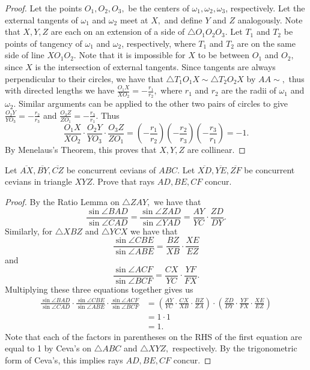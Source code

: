 \documentclass[letterpaper,oneside]{scrartcl}
\providecommand{\ol}{\overline}
\begin{document}
\begin{proof}
  Let the points $O_1,O_2,O_3,$ be the centers of $\omega_1, \omega_2, \omega_3$, respectively.
  Let the external tangents of $\omega_1$ and $\omega_2$ meet at $X,$ and define $Y$ and $Z$ analogously. Note that $X,Y,Z$ are each on an extension of a side of $\triangle O_1O_2O_3.$ Let $T_1$ and $T_2$ be points of tangency of $\omega_1$ and $\omega_2$, respectively, where $T_1$ and $T_2$ are on the same side of line $XO_1O_2.$ Note that it is impossible for $X$ to be between $O_1$ and $O_2,$ since $X$ is the intersection of external tangents. Since tangents are always perpendicular to their circles, we have that $\triangle T_1O_1X \sim \triangle T_2O_2X$ by $AA\sim,$ thus with directed lengths we have $\frac{O_1X}{XO_2} = -\frac{r_1}{r_2},$ where $r_1$ and $r_2$ are the radii of $\omega_1$ and $\omega_2.$ Similar arguments can be applied to the other two pairs of circles to give $\frac{O_2Y}{YO_3} = -\frac{r_2}{r_3}$ and $\frac{O_3Z}{ZO_1} = -\frac{r_3}{r_1}.$ Thus
  $$\frac{O_1X}{XO_2}\cdot\frac{O_2Y}{YO_3}\cdot\frac{O_3Z}{ZO_1} = \left(-\frac{r_1}{r_2}\right)\left(-\frac{r_2}{r_3}\right)\left(-\frac{r_3}{r_1}\right) = -1.$$ By Menelaus's Theorem, this proves that $X,Y,Z$ are collinear.
\end{proof}

\begin{theorem*}
  Let $\ol{AX},\ol{BY},\ol{CZ}$ be concurrent cevians of $ABC$. Let $\ol{XD}, \ol{YE},\ol{ZF}$ be concurrent cevians in triangle $XYZ$. Prove that rays $AD,BE,CF$ concur.
\end{theorem*}

\begin{proof}
  By the Ratio Lemma on $\triangle ZAY,$ we have that
  $$\frac{\sin\angle BAD}{\sin \angle CAD} = \frac{\sin\angle ZAD}{\sin \angle YAD} = \frac{AY}{YC}\cdot\frac{ZD}{DY}.$$
  Similarly, for $\triangle XBZ$ and $\triangle YCX$ we have that
  $$\frac{\sin\angle CBE}{\sin \angle ABE} = \frac{BZ}{XB}\cdot\frac{XE}{EZ}$$ and $$\frac{\sin\angle ACF}{\sin \angle BCF} = \frac{CX}{YC}\cdot\frac{YF}{FX}.$$
  Multiplying these three equations together gives us
  \begin{align*}
    \frac{\sin\angle BAD}{\sin \angle CAD}\cdot\frac{\sin\angle CBE}{\sin \angle ABE}\cdot\frac{\sin\angle ACF}{\sin \angle BCF} & = \left(\frac{AY}{YC}\cdot\frac{CX}{XB}\cdot\frac{BZ}{ZA}\right)\cdot\left(\frac{ZD}{DY}\cdot\frac{YF}{FX}\cdot\frac{XE}{EZ}\right) \\
                                                                                                                                 & = 1\cdot1                                                                                                                           \\
                                                                                                                                 & = 1.
  \end{align*}
  Note that each of the factors in parentheses on the RHS of the first equation are equal to 1 by Ceva's on $\triangle ABC$ and $\triangle XYZ,$ respectively. By the trigonometric form of Ceva's, this implies rays $AD,BE,CF$ concur.
\end{proof}
\end{document}
